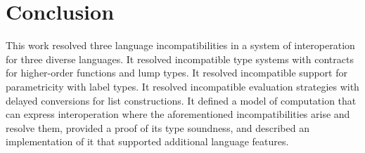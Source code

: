 \chapter{Conclusion}

This work resolved three language incompatibilities in a system of interoperation for three diverse languages.  It resolved incompatible type systems with contracts for higher-order functions and lump types.  It resolved incompatible support for parametricity with label types.  It resolved incompatible evaluation strategies with delayed conversions for list constructions.  It defined a model of computation that can express interoperation where the aforementioned incompatibilities arise and resolve them, provided a proof of its type soundness, and described an implementation of it that supported additional language features.

